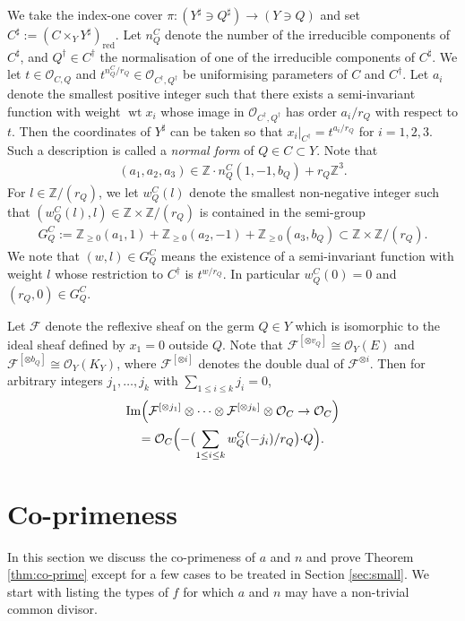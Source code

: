 \documentclass[a4paper,11pt]{amsart}
\theoremstyle{definition}
\theoremstyle{remark}
\numberwithin{equation}{section}
\newcommand{\bZ}{{\mathbb Z}}
\newcommand{\cF}{{\mathcal F}}
\newcommand{\cO}{{\mathcal O}}
\newcommand{\Img}{\operatorname{Im}}
\newcommand{\red}{\mathrm{red}}
\newcommand{\wt}{\operatorname{wt}}
\begin{document}
We take the index-one cover $\pi \colon (Y^\sharp \ni Q^\sharp) \to (Y \ni Q)$
and set $C^\sharp:=(C \times_Y Y^\sharp)_\red$.
Let $n_Q^C$ denote the number of the irreducible components of $C^\sharp$,
and $Q^\dag \in C^\dag$ the normalisation of
one of the irreducible components of $C^\sharp$.
We let $t \in \cO_{C, Q}$ and $t^{n_Q^C/r_Q} \in \cO_{C^\dag, Q^\dag}$ be
uniformising parameters of $C$ and $C^\dag$.
Let $a_i$ denote the smallest positive integer such that
there exists a semi-invariant function with weight $\wt x_i$
whose image in $\cO_{C^\dag, Q^\dag}$ has
order $a_i/r_Q$ with respect to $t$.
Then the coordinates of $Y^\sharp$ can be taken so that
$x_i |_{C^\dag}=t^{a_i/r_Q}$ for $i=1,2,3$.
Such a description is called a \textit{normal form} of $Q \in C \subset Y$.
Note that
\begin{align*}
(a_1,a_2,a_3) \in \bZ \cdot n_Q^C(1,-1,b_Q) +r_Q\bZ^3.
\end{align*}
For $l \in \bZ/(r_Q)$,
we let $w_Q^C(l)$ denote the smallest non-negative integer
such that $(w_Q^C(l),l) \in \bZ \times \bZ/(r_Q)$ is contained in
the semi-group
\begin{align}\label{eqn:semigroup}
G_Q^C:=\bZ_{\ge0}(a_1,1)+\bZ_{\ge0}(a_2,-1)+\bZ_{\ge0}(a_3,b_Q)
\subset \bZ \times \bZ/(r_Q).
\end{align}
We note that $(w,l) \in G_Q^C$ means the existence of
a semi-invariant function with weight $l$ whose restriction to $C^\dag$
is $t^{w/r_Q}$.
In particular $w_Q^C(0)=0$ and $(r_Q, 0) \in G_Q^C$.

Let $\cF$ denote the reflexive sheaf on the germ $Q \in Y$
which is isomorphic to the ideal sheaf defined by $x_1=0$ outside $Q$.
Note that
$\cF^{[\otimes v_Q]} \cong \cO_Y(E)$ and
$\cF^{[\otimes b_Q]} \cong \cO_Y(K_Y)$,
where $\cF^{[\otimes i]}$ denotes the double dual of $\cF^{\otimes i}$.
Then for arbitrary integers $j_1, \ldots, j_k$
with $\sum_{1 \le i \le k} j_i=0$,
\begin{multline}\label{eqn:how.to.comp}
\Img \Bigl(\cF^{[\otimes j_1]} \otimes \cdots \otimes
\cF^{[\otimes j_k]} \otimes \cO_C \to \cO_C\Bigr) \\
= \cO_C\Bigl(-\bigl({\sum_{1 \le i \le k} w_Q^C(-j_i)/r_Q}\bigl) \cdot Q\Bigr).
\end{multline}

\section{Co-primeness}\label{sec:co-primeness}
In this section we discuss the co-primeness of $a$ and $n$
and prove Theorem \ref{thm:co-prime}
except for a few cases to be treated in Section \ref{sec:small}.
We start with listing the types of $f$ for which
$a$ and $n$ may have a non-trivial common divisor.
\end{document}
